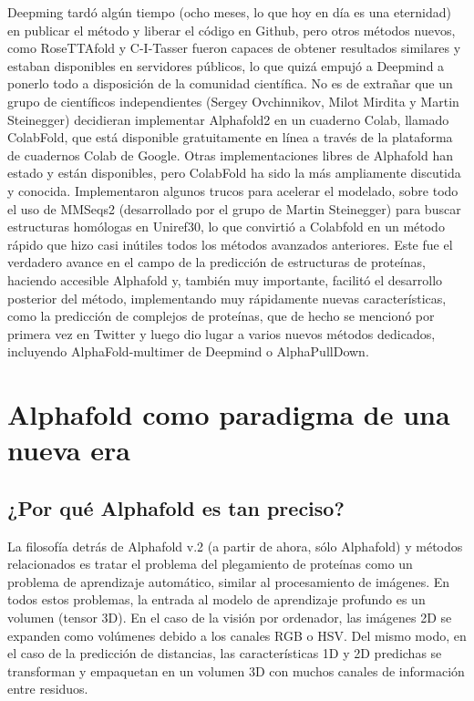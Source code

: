 Deepming tardó algún tiempo (ocho meses, lo que hoy en día es una eternidad) en publicar el método y liberar el código en Github, pero otros métodos nuevos, como RoseTTAfold y C-I-Tasser fueron capaces de obtener resultados similares y estaban disponibles en servidores públicos, lo que quizá empujó a Deepmind a ponerlo todo a disposición de la comunidad científica. No es de extrañar que un grupo de científicos independientes (Sergey Ovchinnikov, Milot Mirdita y Martin Steinegger) decidieran implementar Alphafold2 en un cuaderno Colab, llamado ColabFold, que está disponible gratuitamente en línea a través de la plataforma de cuadernos Colab de Google. Otras implementaciones libres de Alphafold han estado y están disponibles, pero ColabFold ha sido la más ampliamente discutida y conocida. Implementaron algunos trucos para acelerar el modelado, sobre todo el uso de MMSeqs2 (desarrollado por el grupo de Martin Steinegger) para buscar estructuras homólogas en Uniref30, lo que convirtió a Colabfold en un método rápido que hizo casi inútiles todos los métodos avanzados anteriores. Este fue el verdadero avance en el campo de la predicción de estructuras de proteínas, haciendo accesible Alphafold y, también muy importante, facilitó el desarrollo posterior del método, implementando muy rápidamente nuevas características, como la predicción de complejos de proteínas, que de hecho se mencionó por primera vez en Twitter y luego dio lugar a varios nuevos métodos dedicados, incluyendo AlphaFold-multimer de Deepmind o AlphaPullDown.

\section{Alphafold como paradigma de una nueva era}
\subsection{¿Por qué Alphafold es tan preciso?}
La filosofía detrás de Alphafold v.2 (a partir de ahora, sólo Alphafold) y métodos relacionados es tratar el problema del plegamiento de proteínas como un problema de aprendizaje automático, similar al procesamiento de imágenes. En todos estos problemas, la entrada al modelo de aprendizaje profundo es un volumen (tensor 3D). En el caso de la visión por ordenador, las imágenes 2D se expanden como volúmenes debido a los canales RGB o HSV. Del mismo modo, en el caso de la predicción de distancias, las características 1D y 2D predichas se transforman y empaquetan en un volumen 3D con muchos canales de información entre residuos.

